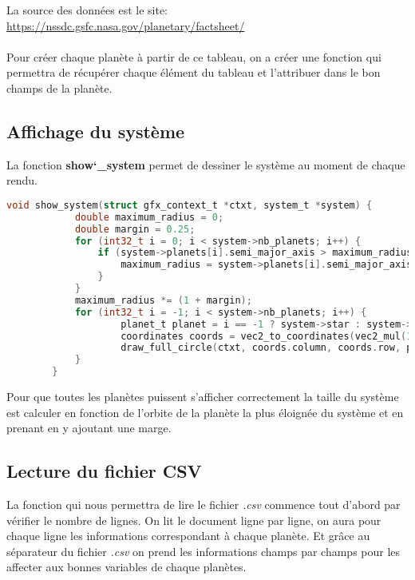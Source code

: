 \documentclass[a4paper,10pt]{article}
\begin{document}
    La source des données est le site: \href{https://nssdc.gsfc.nasa.gov/planetary/factsheet/}{https://nssdc.gsfc.nasa.gov/planetary/factsheet/} \\\\
    
    Pour créer chaque planète à partir de ce tableau, on a créer une fonction qui permettra de récupérer chaque élément du tableau et l'attribuer dans le bon champs de la planète.
    
    \subsection{Affichage du système}\label{subsec:affichage-du-système}

    La fonction \textbf{show\char`_system} permet de dessiner le système au moment de chaque rendu.

    \begin{lstlisting}[language=c,label={lst:lstlisting8}]
        void show_system(struct gfx_context_t *ctxt, system_t *system) {
            double maximum_radius = 0;
            double margin = 0.25;
            for (int32_t i = 0; i < system->nb_planets; i++) {
                if (system->planets[i].semi_major_axis > maximum_radius) {
                    maximum_radius = system->planets[i].semi_major_axis;
                }
            }
            maximum_radius *= (1 + margin);
            for (int32_t i = -1; i < system->nb_planets; i++) {
                    planet_t planet = i == -1 ? system->star : system->planets[i];
                    coordinates coords = vec2_to_coordinates(vec2_mul(1.0 / maximum_radius, planet.pos), SCREEN_WIDTH, SCREEN_HEIGHT);
                    draw_full_circle(ctxt, coords.column, coords.row, planet.radius, planet.color);
            }
        }
    \end{lstlisting}

    Pour que toutes les planètes puissent s'afficher correctement la taille du système est calculer en fonction de l'orbite de la planète la plus éloignée du système et en prenant en y ajoutant une marge.

    \subsection{Lecture du fichier CSV}\label{subsec:lecture-du-fichier-csv}

    La fonction qui nous permettra de lire le fichier \emph{.csv} commence tout d'abord par vérifier le nombre de lignes. On lit le document ligne par ligne, on aura pour chaque ligne les informations correspondant à chaque planète.
    Et grâce au séparateur du fichier \emph{.csv} on prend les informations champs par champs pour les affecter aux bonnes variables de chaque planètes.
\end{document}
